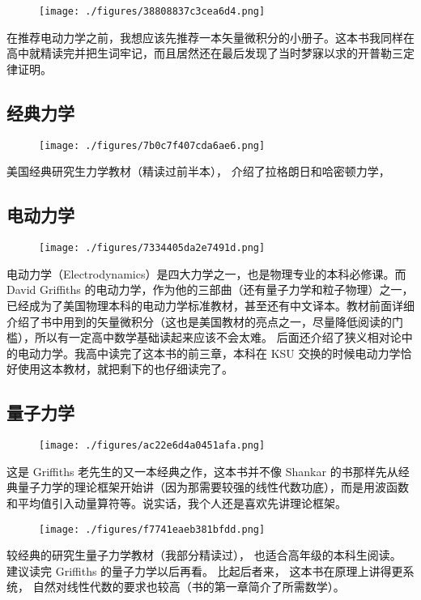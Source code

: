 \begin{figure}[ht]
\centering
\texttt{[image: ./figures/38808837c3cea6d4.png]}
\caption{} \label{fig_PhText_2}
\end{figure}
在推荐电动力学之前，我想应该先推荐一本矢量微积分的小册子。这本书我同样在高中就精读完并把生词牢记，而且居然还在最后发现了当时梦寐以求的开普勒三定律证明。


\subsection{经典力学}

\begin{figure}[ht]
\centering
\texttt{[image: ./figures/7b0c7f407cda6ae6.png]}
\caption{} \label{fig_PhText_3}
\end{figure}
美国经典研究生力学教材（精读过前半本）， 介绍了拉格朗日和哈密顿力学，

\subsection{电动力学}
\begin{figure}[ht]
\centering
\texttt{[image: ./figures/7334405da2e7491d.png]}
\caption{} \label{fig_PhText_5}
\end{figure}
电动力学（Electrodynamics）是四大力学之一，也是物理专业的本科必修课。而 David Griffiths 的电动力学，作为他的三部曲（还有量子力学和粒子物理）之一，已经成为了美国物理本科的电动力学标准教材，甚至还有中文译本。教材前面详细介绍了书中用到的矢量微积分（这也是美国教材的亮点之一，尽量降低阅读的门槛），所以有一定高中数学基础读起来应该不会太难。 后面还介绍了狭义相对论中的电动力学。我高中读完了这本书的前三章，本科在 KSU 交换的时候电动力学恰好使用这本教材，就把剩下的也仔细读完了。

\subsection{量子力学}
\begin{figure}[ht]
\centering
\texttt{[image: ./figures/ac22e6d4a0451afa.png]}
\caption{} \label{fig_PhText_6}
\end{figure}
这是 Griffiths 老先生的又一本经典之作，这本书并不像 Shankar 的书那样先从经典量子力学的理论框架开始讲（因为那需要较强的线性代数功底），而是用波函数和平均值引入动量算符等。说实话，我个人还是喜欢先讲理论框架。

\begin{figure}[ht]
\centering
\texttt{[image: ./figures/f7741eaeb381bfdd.png]}
\caption{} \label{fig_PhText_8}
\end{figure}
较经典的研究生量子力学教材（我部分精读过）， 也适合高年级的本科生阅读。 建议读完 Griffiths 的量子力学以后再看。 比起后者来， 这本书在原理上讲得更系统， 自然对线性代数的要求也较高（书的第一章简介了所需数学）。
